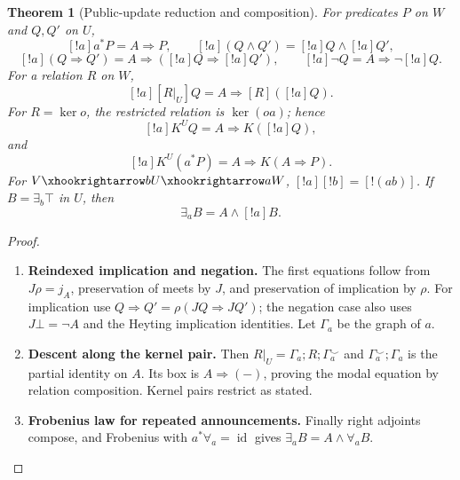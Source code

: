 \documentclass[11pt,a4paper]{article}
\numberwithin{equation}{section}
\newtheorem{theorem}{Theorem}[section]
\theoremstyle{definition}
\theoremstyle{remark}
\theoremstyle{plain}
\begin{document}
\begin{theorem}[Public-update reduction and composition]
\label{thm:egt-public-update-reduction}
\label{prop:egt-public-update-composition}
For predicates $P$ on $W$ and $Q,Q'$ on $U$,
\[
 [!a]a^*P=A\Rightarrow P,\qquad
 [!a](Q\wedge Q')=[!a]Q\wedge[!a]Q',
\]
\[
 [!a](Q\Rightarrow Q')
 =A\Rightarrow([!a]Q\Rightarrow[!a]Q'),\qquad
 [!a]\neg Q=A\Rightarrow\neg[!a]Q.
\]
For a relation $R$ on $W$,
\begin{equation}\label{eq:egt-public-update-modal-reduction}
 [!a][R|_U]Q=A\Rightarrow[R]([!a]Q).
\end{equation}
For $R=\ker o$, the restricted relation is $\ker(oa)$; hence
\begin{equation}\label{eq:egt-public-update-knowledge-reduction}
 [!a]K^UQ=A\Rightarrow K([!a]Q),
\end{equation}
and
\begin{equation}\label{eq:egt-announcement}
 [!a]K^U(a^*P)=A\Rightarrow K(A\Rightarrow P).
\end{equation}
For $V\xhookrightarrow bU\xhookrightarrow aW$,
$[!a][!b]=[!(ab)]$. If $B=\exists_b\top$ in $U$, then
\begin{equation}\label{eq:egt-composite-announcement}
 \exists_aB=A\wedge[!a]B.
\end{equation}
\end{theorem}
\begin{proof}
\leavevmode
\begin{enumerate}[label=\textup{(\arabic*)},leftmargin=*,itemsep=4pt,topsep=3pt]
  \item \textbf{Reindexed implication and negation.} The first equations follow from $J\rho=j_A$, preservation of meets by $J$,
and preservation of implication by $\rho$. For implication use
$Q\Rightarrow Q'=\rho(JQ\Rightarrow JQ')$; the negation case also uses
$J\bot=\neg A$ and the Heyting implication identities. Let $\Gamma_a$ be the graph of $a$.
  \item \textbf{Descent along the kernel pair.} Then
$R|_U=\Gamma_a;R;\Gamma_a^\smile$ and
$\Gamma_a^\smile;\Gamma_a$ is the partial identity on $A$. Its box is $A\Rightarrow(-)$, proving the modal equation by relation
composition. Kernel pairs restrict as stated.
  \item \textbf{Frobenius law for repeated announcements.} Finally right adjoints compose,
and Frobenius with $a^*\forall_a=\operatorname{id}$ gives
$\exists_aB=A\wedge\forall_aB$.
\end{enumerate}
\end{proof}
\end{document}
